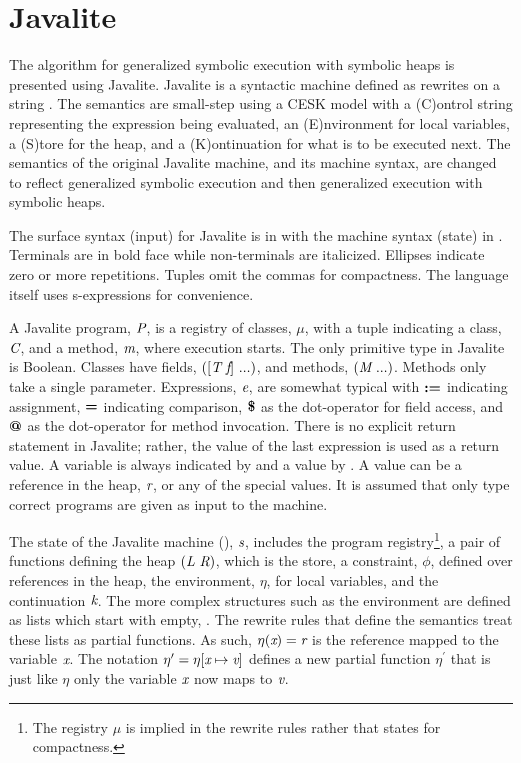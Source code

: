 \section{Javalite}
The algorithm for generalized symbolic execution with symbolic heaps
is presented using Javalite. Javalite is a syntactic machine defined
as rewrites on a string \cite{saints-MS}. The semantics are small-step
using a CESK model with a (C)ontrol string representing the expression
being evaluated, an (E)nvironment for local variables, a (S)tore for
the heap, and a (K)ontinuation for what is to be executed next. The
semantics of the original Javalite machine, and its machine syntax,
are changed to reflect generalized symbolic execution and then
generalized execution with symbolic heaps.

The surface syntax (input) for Javalite is in
 with the machine syntax (state) in
. Terminals are in bold face while
non-terminals are italicized. Ellipses indicate zero or more
repetitions. Tuples omit the commas for compactness. The language
itself uses s-expressions for convenience.




A Javalite program, $\emph{P}$, is a registry of classes, $\mu$, with
a tuple indicating a class, $\emph{C}$, and a method, $\emph{m}$,
where execution starts. The only primitive type in Javalite is
Boolean. Classes have fields, $([\emph{T}\ \emph{f}]\ ...)$, and
methods, $(\emph{M}\ ...)$. Methods only take a single
parameter. Expressions, $\emph{e}$, are somewhat typical with
$\textbf{:=}$ indicating assignment, $\textbf{=}$ indicating comparison,
$\textbf{\$}$ as the dot-operator for field access, and $\textbf{@}$ as
the dot-operator for method invocation. There is no explicit return
statement in Javalite; rather, the value of the last expression is
used as a return value. A variable is always indicated by 
and a value by . A value can be a reference in the heap,
$\emph{r}$, or any of the special values. It is assumed that only
type correct programs are given as input to the machine.

The state of the Javalite machine (),
$\emph{s}$, includes the program registry\footnote{The registry $\mu$
  is implied in the rewrite rules rather that states for
  compactness.}, a pair of functions defining the heap
$(\emph{L}\ \emph{R})$, which is the store, a constraint,
$\phi$, defined over references in the heap, the environment, $\eta$,
for local variables, and the continuation $\emph{k}$. The more
complex structures such as the environment are defined as lists which
start with empty, . The rewrite rules that define the
semantics treat these lists as partial functions. As such,
$\eta(\emph{x}) = \emph{r}$ is the reference mapped to the variable
$\emph{x}$. The notation $\eta^\prime = \eta[\emph{x} \mapsto
  \emph{v}]$ defines a new partial function $\eta^\prime$ that is
just like $\eta$ only the variable $\emph{x}$ now maps to
$\emph{v}$.

